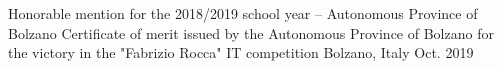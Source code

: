 

\begin{cvhonors}

  \cvhonor
    {Honorable mention for the 2018/2019 school year – Autonomous Province of Bolzano} %
    {Certificate of merit issued by the Autonomous Province of Bolzano for the victory in the "Fabrizio Rocca" IT competition} %
    {Bolzano, Italy} %
    {Oct. 2019} %

\end{cvhonors}

